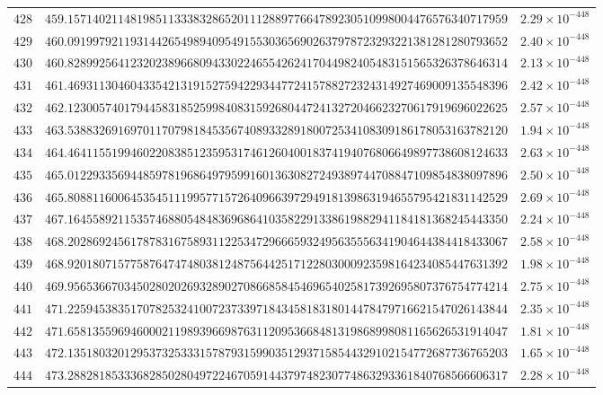 \documentclass[12pt,reqno]{amsart}
\theoremstyle{remark}
\begin{document}
\begin{longtable}{clc}
$428$ & $459.1571402114819851133383286520111288977664789230510998004476576340717959$ & $2.29\times 10^{-448}$ \\
$429$ & $460.0919979211931442654989409549155303656902637978723293221381281280793652$ & $2.40\times 10^{-448}$ \\
$430$ & $460.8289925641232023896680943302246554262417044982405483151565326378646314$ & $2.13\times 10^{-448}$ \\
$431$ & $461.4693113046043354213191527594229344772415788272324314927469009135548396$ & $2.42\times 10^{-448}$ \\
$432$ & $462.1230057401794458318525998408315926804472413272046623270617919696022625$ & $2.57\times 10^{-448}$ \\
$433$ & $463.5388326916970117079818453567408933289180072534108309186178053163782120$ & $1.94\times 10^{-448}$ \\
$434$ & $464.4641155199460220838512359531746126040018374194076806649897738608124633$ & $2.63\times 10^{-448}$ \\
$435$ & $465.0122933569448597819686497959916013630827249389744708847109854838097896$ & $2.50\times 10^{-448}$ \\
$436$ & $465.8088116006453545111995771572640966397294918139863194655795421831142529$ & $2.69\times 10^{-448}$ \\
$437$ & $467.1645589211535746880548483696864103582291338619882941184181368245443350$ & $2.24\times 10^{-448}$ \\
$438$ & $468.2028692456178783167589311225347296665932495635556341904644384418433067$ & $2.58\times 10^{-448}$ \\
$439$ & $468.9201807157758764747480381248756442517122803000923598164234085447631392$ & $1.98\times 10^{-448}$ \\
$440$ & $469.9565366703450280202693289027086685845469654025817392695807376754774214$ & $2.75\times 10^{-448}$ \\
$441$ & $471.2259453835170782532410072373397184345818318014478479716621547026143844$ & $2.35\times 10^{-448}$ \\
$442$ & $471.6581355969460002119893966987631120953668481319868998081165626531914047$ & $1.81\times 10^{-448}$ \\
$443$ & $472.1351803201295373253331578793159903512937158544329102154772687736765203$ & $1.65\times 10^{-448}$ \\
$444$ & $473.2882818533368285028049722467059144379748230774863293361840768566606317$ & $2.28\times 10^{-448}$ \\

\end{longtable}
\end{document}
